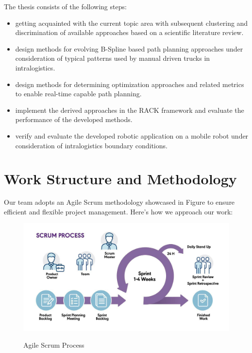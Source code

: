 The thesis consists of the following steps: 
\begin{itemize}
    \item 	getting acquainted with the current topic area with subsequent clustering and discrimination 
    of available approaches based on a scientific literature review.
    \item  	design methods for evolving B-Spline based path planning approaches under consideration of 
    typical patterns used by manual driven trucks in intralogistics.
    \item   design methods for determining optimization approaches and related metrics to enable 
    real-time capable path planning.
    \item  	implement the derived approaches in the RACK framework and evaluate the performance of 
    the developed methods. 
    \item	verify and evaluate the developed robotic application on a mobile robot under consideration 
    of intralogistics boundary conditions.
\end{itemize}

\section{Work Structure and Methodology}

Our team adopts an Agile Scrum methodology showcased in Figure  to ensure 
efficient and flexible project management. Here’s how we approach our work:

\begin{figure}[H]
    \begin{center}
       \includegraphics[width=6in]{images/Chap0/blog-scrum-process-opt.jpg}\\
       \caption{Agile Scrum Process \cite{R6}}
       \label{Agile Scrum Process}
       \end{center}
\end{figure}


